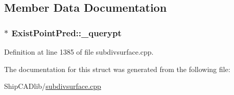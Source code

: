\subsection{Member Data Documentation}
\hypertarget{structExistPointPred_a359c6d3bff7f508b63f7babe7189a4a1}{
\subsubsection[{\-\_\-querypt}]{$\ast$ Exist\-Point\-Pred\-::\-\_\-querypt}}\label{structExistPointPred_a359c6d3bff7f508b63f7babe7189a4a1}


Definition at line 1385 of file subdivsurface.\-cpp.



The documentation for this struct was generated from the following file\-:\begin{DoxyCompactItemize}
\item 
Ship\-C\-A\-Dlib/\hyperlink{subdivsurface_8cpp}{subdivsurface.\-cpp}\end{DoxyCompactItemize}
